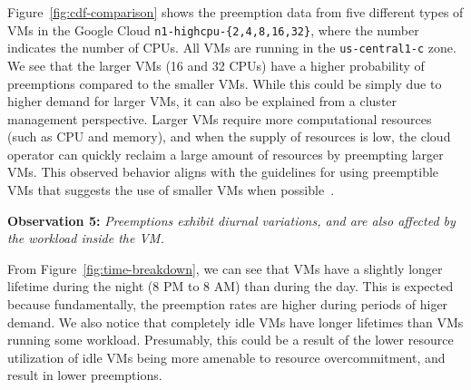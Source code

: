 Figure~\ref{fig:cdf-comparison} shows the preemption data from five different types of VMs in the Google Cloud \texttt{n1-highcpu-\{2,4,8,16,32\}}, where the number indicates the number of CPUs.
All VMs are running in the \texttt{us-central1-c} zone. 
We see that the larger VMs (16 and 32 CPUs) have a higher probability of preemptions compared to the smaller VMs.
While this could be simply due to higher demand for larger VMs, it can also be explained from a cluster management perspective. 
Larger VMs require more computational resources (such as CPU and memory), and when the supply of resources is low, the cloud operator can quickly reclaim a large amount of resources by preempting larger VMs.
This observed behavior aligns with the guidelines for using preemptible VMs that suggests the use of smaller VMs when possible~\cite{preemptible-documentation}. 

\noindent \textbf{Observation 5:} \emph{Preemptions exhibit diurnal variations, and are also affected by the workload inside the VM.}

From Figure~\ref{fig:time-breakdown}, we can see that VMs have a slightly longer lifetime during the night (8 PM to 8 AM) than during the day\footnotemark. 
This is expected because fundamentally, the preemption rates are higher during periods of higer demand. 
%
We also notice that completely idle VMs have longer lifetimes than VMs running some workload.
Presumably, this could be a result of the lower resource utilization of idle VMs being more amenable to resource overcommitment, and result in lower preemptions. 







